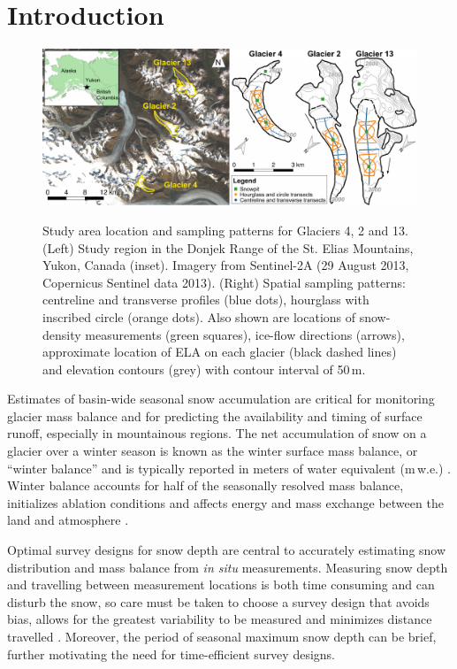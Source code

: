 \documentclass[twocolumn,letterpaper]{igs}
\begin{document}
\section{Introduction}

\begin{figure}
	\centering
	\includegraphics[width =\textwidth]{Pulwicki_Fig1.pdf}\\
	\caption{Study area location and sampling patterns for Glaciers 4, 2 and 13. (Left) Study region in the Donjek Range of the St. Elias Mountains, Yukon, Canada (inset). Imagery from Sentinel-2A (29 August 2013, Copernicus Sentinel data 2013). (Right) Spatial sampling patterns:  centreline and transverse profiles (blue dots), hourglass with inscribed circle (orange dots). Also shown are locations of snow-density measurements  (green squares), ice-flow directions (arrows), approximate location of ELA on each glacier (black dashed lines) and elevation contours (grey) with contour interval of 50\,m.}
	\label{fig:Sampling}
\end{figure} 

Estimates of basin-wide seasonal snow accumulation are critical for monitoring glacier mass balance and for predicting the availability and timing of surface runoff, especially in mountainous regions. The net accumulation of snow on a glacier over a winter season is known as the winter surface mass balance, or ``winter balance'' and is typically reported in meters of water equivalent (m\,w.e.) \citep{Cogley2011}. Winter balance accounts for half of the seasonally resolved mass balance, initializes ablation conditions and affects energy and mass exchange between the land and atmosphere \citep[e.g.][]{Hock2005, Reveillet2016}. 

Optimal survey designs for snow depth are central to accurately estimating snow distribution and mass balance from \textit{in situ} measurements. Measuring snow depth and travelling between measurement locations is both time consuming and can disturb the snow, so care must be taken to choose a survey design that avoids bias, allows for the greatest variability to be measured and minimizes distance travelled \citep[e.g.][]{Shea2010,Kinar2015}. Moreover, the period of seasonal maximum snow depth can be brief, further motivating the need for time-efficient survey designs. 
\end{document}
